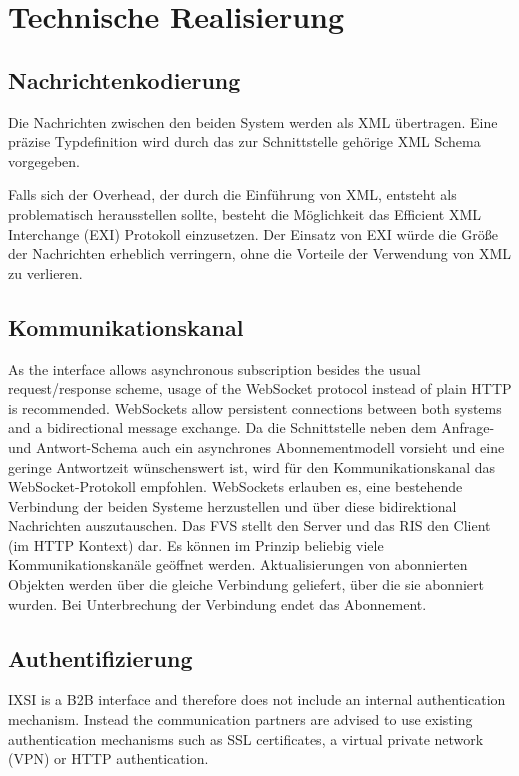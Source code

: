 \chapter{Technische Realisierung}
\label{sec:TechnischeRealisierung}


\section{Nachrichtenkodierung}
Die Nachrichten zwischen den beiden System werden als XML übertragen. Eine präzise Typdefinition wird durch das zur Schnittstelle gehörige XML Schema vorgegeben.

Falls sich der Overhead, der durch die Einführung von XML, entsteht als problematisch herausstellen sollte, besteht die Möglichkeit das Efficient XML Interchange (EXI) Protokoll einzusetzen. Der Einsatz von EXI würde die Größe der Nachrichten erheblich verringern, ohne die Vorteile der Verwendung von XML zu verlieren.

\section{Kommunikationskanal}
As the interface allows asynchronous subscription besides the usual request/response scheme, usage of the WebSocket protocol instead of plain HTTP is recommended.
WebSockets allow persistent connections between both systems and a bidirectional message exchange. Da die Schnittstelle neben dem Anfrage- und Antwort-Schema auch ein asynchrones Abonnementmodell vorsieht und eine geringe Antwortzeit wünschenswert ist, wird für den Kommunikationskanal das WebSocket-Protokoll empfohlen. WebSockets erlauben es, eine bestehende Verbindung der beiden Systeme herzustellen und über diese bidirektional Nachrichten auszutauschen. Das FVS stellt den Server und das RIS den Client (im HTTP Kontext) dar. Es können im Prinzip beliebig viele Kommunikationskanäle geöffnet werden. Aktualisierungen von abonnierten Objekten werden über die gleiche Verbindung geliefert, über die sie abonniert wurden. Bei Unterbrechung der Verbindung endet das Abonnement.

\section{Authentifizierung}
IXSI is a B2B interface and therefore does not include an internal authentication mechanism. Instead the communication partners are advised to use existing authentication mechanisms such as SSL certificates, a virtual private network (VPN) or HTTP authentication.

